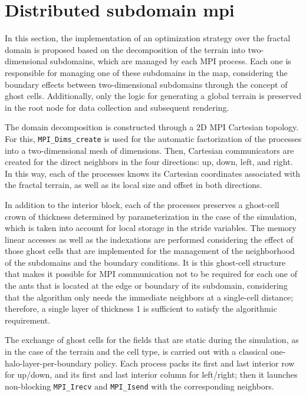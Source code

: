 \section{Distributed subdomain mpi}

In this section, the implementation of an optimization strategy over the fractal domain is proposed based on the decomposition of the terrain into two-dimensional subdomains, which are managed by each MPI process. Each one is responsible for managing one of these subdomains in the map, considering the boundary effects between two-dimensional subdomains through the concept of ghost cells. Additionally, only the logic for generating a global terrain is preserved in the root node for data collection and subsequent rendering.

The domain decomposition is constructed through a 2D MPI Cartesian topology. For this, \texttt{MPI\_Dims\_create} is used for the automatic factorization of the processes into a two-dimensional mesh of dimensions. Then, Cartesian communicators are created for the direct neighbors in the four directions: up, down, left, and right. In this way, each of the processes knows its Cartesian coordinates associated with the fractal terrain, as well as its local size and offset in both directions.

In addition to the interior block, each of the processes preserves a ghost-cell crown of thickness determined by parameterization in the case of the simulation, which is taken into account for local storage in the stride variables. The memory linear accesses as well as the indexations are performed considering the effect of those ghost cells that are implemented for the management of the neighborhood of the subdomains and the boundary conditions. It is this ghost-cell structure that makes it possible for MPI communication not to be required for each one of the ants that is located at the edge or boundary of its subdomain, considering that the algorithm only needs the immediate neighbors at a single-cell distance; therefore, a single layer of thickness 1 is sufficient to satisfy the algorithmic requirement.

The exchange of ghost cells for the fields that are static during the simulation, as in the case of the terrain and the cell type, is carried out with a classical one-halo-layer-per-boundary policy. Each process packs its first and last interior row for up/down, and its first and last interior column for left/right; then it launches non-blocking \texttt{MPI\_Irecv} and \texttt{MPI\_Isend} with the corresponding neighbors.


